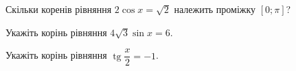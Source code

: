 \documentclass[12pt]{article}
\begin{document}
\begingroup\setcounter{zad}{0}
\providecommand{\trigStyle}[1]{#1}
\providecommand{\answerTableSmall}[5]{%
\begingroup\setlength{\tabcolsep}{2pt}\small\nmtSetCell
\begin{tabular}{|*{5}{>{\centering\arraybackslash}m{\nmtcellw}|}}
\hline
\rule[-0.2cm]{0pt}{0.6cm}\textbf{А} & \textbf{Б} & \textbf{В} & \textbf{Г} & \textbf{Д} \\
\hline
\rule[-0.4cm]{0pt}{0.9cm}#1 & \rule[-0.4cm]{0pt}{0.9cm}#2 & \rule[-0.4cm]{0pt}{0.9cm}#3 & \rule[-0.4cm]{0pt}{0.9cm}#4 & \rule[-0.4cm]{0pt}{0.9cm}#5 \\
\hline
\end{tabular}\endgroup}
\providecommand{\answerListVertical}[5]{\nmtOptions{#1}{#2}{#3}{#4}{#5}}

\par\vspace{0.2cm}


\begin{samepage}
\noindent\zadnum Скільки коренів рівняння \trigStyle{$2\cos x = \sqrt{2}$} належить проміжку $[0; \pi]$? 

\nmtnobreak
\nopagebreak\nbvspace{0.3cm}
\par{}
\end{samepage}

\begin{samepage}
\noindent\zadnum Укажіть корінь рівняння \trigStyle{$4\sqrt{3}\sin x = 6$}. 

\nmtnobreak
\nopagebreak\nbvspace{0.3cm}
\par{}
\end{samepage}

\begin{samepage}
\noindent\zadnum Укажіть корінь рівняння \trigStyle{$\operatorname{tg} \dfrac{x}{2} = -1$}. 

\nmtnobreak
\nopagebreak\nbvspace{0.3cm}
\par{}
\end{samepage}
\end{document}
